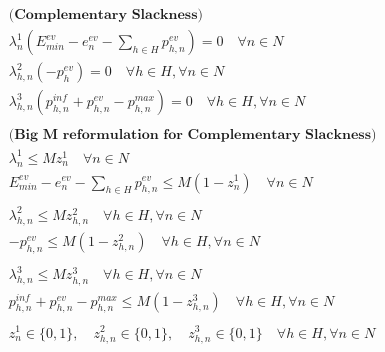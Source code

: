 \begin{align*}
	                          & \textbf{(Complementary Slackness)}                                                                                     \\
	                          & \lambda^1_n \left( E^{ev}_{min} - e^{ev}_n - \sum_{h \in H} p^{ev}_{h,n} \right) = 0 \quad \forall n \in N             \\
	                          & \lambda^2_{h,n} \left( - p^{ev}_h \right) = 0 \quad \forall h \in H, \forall n \in N    \\
                              & \lambda^3_{h,n} \left( p^{inf}_{h,n} + p^{ev}_{h,n} - p^{max}_{h,n} \right) = 0 \quad \forall h \in H, \forall n \in N \\\\
	                          & \textbf{(Big M reformulation for Complementary Slackness)}                                                             \\
	                          & \lambda^1_n \leq M z^1_n \quad \forall n \in N                                                                         \\
	                          & E^{ev}_{min} - e^{ev}_n - \sum_{h \in H} p^{ev}_{h,n} \leq M (1 - z^1_n) \quad \forall n \in N                         \\
                              \\ 
                              & \lambda^2_{h,n} \leq M z^2_{h,n} \quad \forall h \in H, \forall n \in N                                                \\
	                          & - p^{ev}_{h,n} \leq M (1 - z^2_{h,n}) \quad \forall h \in H, \forall n \in N             \\
                              \\
	                          & \lambda^3_{h,n} \leq M z^3_{h,n} \quad \forall h \in H, \forall n \in N                                                \\
	                          & p^{inf}_{h,n} + p^{ev}_{h,n} - p^{max}_{h,n} \leq M (1 - z^3_{h,n}) \quad \forall h \in H, \forall n \in N             \\
                              \\
	                          & z^1_n \in \{0,1\}, \quad z^2_{h,n} \in \{0,1\} , \quad z^3_{h,n} \in \{0,1\}\quad \forall h \in H, \forall n \in N
\end{align*}
